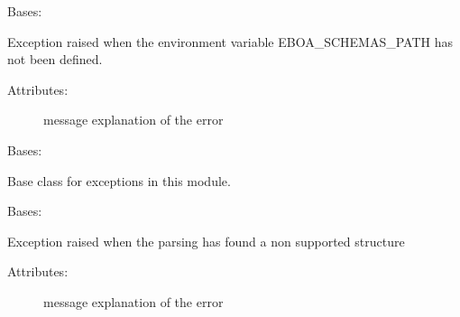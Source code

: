 
\begin{fulllineitems}
\label{\detokenize{eboa.engine:eboa.engine.errors.EboaSchemasPathNotAvailable}}
Bases: {\hyperref[\detokenize{eboa.engine:eboa.engine.errors.Error}]{}}

Exception raised when the environment variable EBOA\_SCHEMAS\_PATH has not been defined.
\begin{description}
\item[{Attributes:}] \leavevmode
message \textendash{} explanation of the error

\end{description}

\end{fulllineitems}


\begin{fulllineitems}
\label{\detokenize{eboa.engine:eboa.engine.errors.Error}}
Bases: 

Base class for exceptions in this module.

\end{fulllineitems}


\begin{fulllineitems}
\label{\detokenize{eboa.engine:eboa.engine.errors.ErrorParsingDictionary}}
Bases: {\hyperref[\detokenize{eboa.engine:eboa.engine.errors.Error}]{}}

Exception raised when the parsing has found a non supported structure
\begin{description}
\item[{Attributes:}] \leavevmode
message \textendash{} explanation of the error

\end{description}

\end{fulllineitems}

